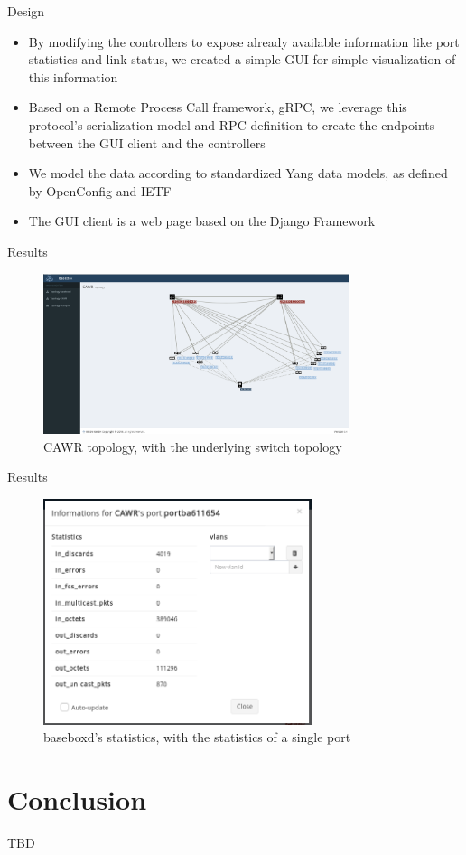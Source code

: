 \documentclass{beamer}
\begin{document}
\begin{frame}{Design}
    \begin{itemize}
        \item By modifying the controllers to expose already available information like port statistics
            and link status, we created a simple GUI for simple visualization of this information
            \pause
        \item Based on a Remote Process Call framework, gRPC, we leverage this protocol's serialization model
            and RPC definition to create the endpoints between the GUI client and the controllers
            \pause
        \item We model the data according to standardized Yang data models, as defined by OpenConfig and IETF
            \pause
        \item The GUI client is a web page based on the Django Framework
    \end{itemize}
\end{frame}

\begin{frame}{Results}
    \begin{figure}[!tbph]
      \centering
      \includegraphics[width=0.8\textwidth]{bisdn/cawr_gui}
      \caption {CAWR topology, with the underlying switch topology}
    \end{figure}
\end{frame}

\begin{frame}{Results}
    \begin{figure}[!tbph]
      \centering
      \includegraphics[width=0.7\textwidth]{bisdn/basebox_gui}
      \caption {baseboxd's statistics, with the statistics of a single port}
    \end{figure}
\end{frame}
\section{Conclusion}

\begin{frame}{}
    TBD
\end{frame}

\printbibliography
\end{document}
